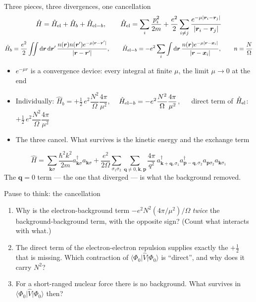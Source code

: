 \documentclass[aspectratio=169,10pt]{beamer}
\newcounter{thinkctr}
\newcommand{\thinkq}[2]{%
  \stepcounter{thinkctr}%
  \vfill
  \begin{tcolorbox}[enhanced,colback=palewarm,colframe=warm,boxrule=1.2pt,arc=4pt,
    grow to left by=6mm,grow to right by=6mm,
    left=16pt,right=16pt,top=16pt,bottom=18pt,
    fonttitle=\bfseries\Large,fontupper=\Large,
    title={Pause to think \#\thethinkctr\hfill\mdseries\normalsize(about #1 min -- discuss with your neighbour)}]
  #2
  \end{tcolorbox}
  \vfill}
\newcommand{\element}[3]{\langle #1\vert #2\vert #3\rangle}
\newcommand{\ad}[1]{a_{#1}^{\dagger}}
\newcommand{\dd}{\mathrm{d}}
\begin{document}
\begin{frame}{Three pieces, three divergences, one cancellation}
  \[
    \hat H=\hat H_{\rm el}+\hat H_b+\hat H_{{\rm el}-b},\qquad
    \hat H_{\rm el}=\sum_i\frac{p_i^2}{2m}+\frac{e^2}{2}\sum_{i\ne j}\frac{e^{-\mu|\bm r_i-\bm r_j|}}{|\bm r_i-\bm r_j|}
  \]
  \[
    \hat H_b=\frac{e^2}{2}\iint\dd\bm r\,\dd\bm r'\,\frac{n(\bm r)n(\bm r')e^{-\mu|\bm r-\bm r'|}}{|\bm r-\bm r'|},\qquad
    \hat H_{{\rm el}-b}=-e^2\sum_i\int\dd\bm r\,\frac{n(\bm r)e^{-\mu|\bm r-\bm x_i|}}{|\bm r-\bm x_i|},\qquad n=\frac N\Omega
  \]
  \begin{itemize}
    \item $e^{-\mu r}$ is a convergence device: every integral at finite $\mu$, the limit $\mu\to0$ at the end
    \item Individually: $\hat H_b=+\tfrac12\,e^2\dfrac{N^2}{\Omega}\dfrac{4\pi}{\mu^2}$, $\quad\hat H_{{\rm el}-b}=-e^2\dfrac{N^2}{\Omega}\dfrac{4\pi}{\mu^2}$, $\quad$ direct term of $\hat H_{\rm el}$: $+\tfrac12\,e^2\dfrac{N^2}{\Omega}\dfrac{4\pi}{\mu^2}$
    \item \alert{The three cancel.} What survives is the kinetic energy and the exchange term
  \end{itemize}
  \[
    \hat H=\sum_{\bm k\sigma}\frac{\hbar^2k^2}{2m}\ad{\bm k\sigma}a_{\bm k\sigma}
    +\frac{e^2}{2\Omega}\sum_{\sigma_1\sigma_2}\sum_{\bm q\ne0,\bm k,\bm p}\frac{4\pi}{q^2}\,
    \ad{\bm k+\bm q,\sigma_1}\ad{\bm p-\bm q,\sigma_2}a_{\bm p\sigma_2}a_{\bm k\sigma_1}
  \]
  \centering The $\bm q=0$ term --- the one that diverged --- is what the background removed.
\end{frame}

\begin{frame}{Pause to think: the cancellation}
  \thinkq{4}{
  \begin{enumerate}
    \item Why is the electron-background term $-e^2N^2(4\pi/\mu^2)/\Omega$ \emph{twice} the background-background term, with the opposite sign? (Count what interacts with what.)
    \item The direct term of the electron-electron repulsion supplies exactly the $+\tfrac12$ that is missing. Which contraction of $\element{\Phi_0}{\hat V}{\Phi_0}$ is ``direct'', and why does it carry $N^2$?
    \item For a short-ranged nuclear force there is no background. What survives in $\element{\Phi_0}{\hat V}{\Phi_0}$ then?
  \end{enumerate}}
\end{frame}
\end{document}
